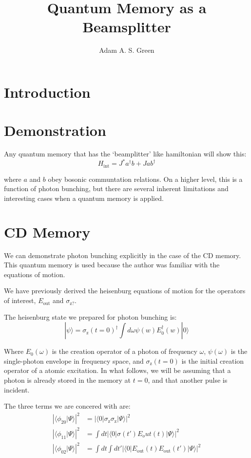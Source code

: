 \documentclass[12pt]{article}
\author{Adam A. S. Green}
\title{Quantum Memory as a Beamsplitter}
\begin{document}


\maketitle
\section{Introduction}


\section{Demonstration}

Any quantum memory that has the `beamplitter' like hamiltonian will show this:
\begin{equation}
H_{\textrm{int}}= J^* a^\dagger b + J a b^\dagger
\end{equation}

where $a$ and $b$ obey bosonic communtation relations. On a higher level, this is a function of photon bunching, but there are several inherent limitations and interesting cases when a quantum memory is applied.

\section{CD Memory}
We can demonstrate photon bunching explicitly in the case of the CD memory\cite{arxiv}. This quantum memory is used because the author was familiar with the equations of motion.

We have previously derived the heisenburg equations of motion for the operators of interest, $E_{\textrm{out}}$ and $\sigma_{\textrm{z?}}$.

The heisenburg state we prepared for photon bunching is:
\begin{equation}
| \psi \rangle = \sigma_\textrm{z}(t=0)^\dagger \int d\omega \psi(w) E_0^\dagger(w) | 0 \rangle
\end{equation}

Where $E_0(\omega)$ is the creation operator of a photon of frequency $\omega$, $\psi(\omega)$ is the single-photon envelope in frequency space, and $\sigma_\textrm{z}(t=0)$ is the initial creation operator of a atomic excitation. In what follows, we will be assuming that a photon is already stored in the memory at $t=0$, and that another pulse is incident.

The three terms we are concered with are:
\begin{align}
\left| \langle \phi_{20}| \Psi \rangle\right|^2 &= \left|\langle 0 | \sigma_\textrm{z} \sigma_\textrm{z} | \Psi \rangle \right|^2\\
\left |\langle \phi_{11} | \Psi \rangle \right|^2 &= \int dt \left|\langle 0 | \sigma(t')  E_out(t) | \Psi \rangle \right|^2\\
\left |\langle \phi_{02} | \Psi \rangle\right|^2 &= \int dt \int dt'\left| \langle 0 |  E_\textrm{out}(t) E_\textrm{out}(t') | \Psi \rangle \right |^2
\end{align}
\end{document}
